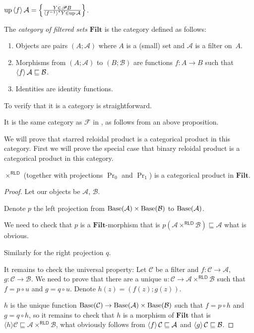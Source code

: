 \begin{cor}
$\operatorname{up}\left\langle f\right\rangle\mathcal{A} = \left\{ \frac{Y\in\mathscr{P} B}{\left\langle f^{-1}\right\rangle ^{\ast}Y\in\operatorname{up}\mathcal{A}}\right\}$.
\end{cor}

\begin{defn}
The \emph{category of filtered sets} $\mathbf{Filt}$ is the category defined as follows:
\begin{enumerate}
\item Objects are pairs $(A;\mathcal{A})$ where $A$ is a (small) set and $\mathcal{A}$ is a filter on~$A$.
\item Morphisms from $(A;\mathcal{A})$ to $(B;\mathcal{B})$ are functions $f:A\rightarrow B$ such that
$\left\langle f\right\rangle\mathcal{A} \sqsubseteq \mathcal{B}$.
\item Identities are identity functions.
\end{enumerate}
\end{defn}

To verify that it is a category is straightforward.

It is the same category as $\mathscr{F}$ in \cite{filt-cat}, as follows from an above proposition.

We will prove that starred reloidal product is a categorical product in this category.
First we will prove the special case that binary reloidal product is a categorical product in this category.

\begin{thm}
  $\times^{\mathsf{RLD}}$ (together with projections $\Pr_0$ and
  $\Pr_1$) is a categorical product in $\mathbf{Filt}$.
\end{thm}

\begin{proof}
  Let our objects be $\mathcal{A}$, $\mathcal{B}$.
  
  Denote $p$ the left projection from $\operatorname{Base} (\mathcal{A}) \times
  \operatorname{Base} (\mathcal{B})$ to $\operatorname{Base} (\mathcal{A})$.
  
  We need to check that $p$ is a $\mathbf{Filt}$-morphism that is $p
  (\mathcal{A} \times^{\mathsf{RLD}} \mathcal{B}) \sqsubseteq
  \mathcal{A}$ what is obvious.
  
  Similarly for the right projection $q$.
  
  It remains to check the universal property: Let $\mathcal{C}$ be a filter
  and $f : \mathcal{C} \rightarrow \mathcal{A}$, $g : \mathcal{C} \rightarrow
  \mathcal{B}$. We need to prove that there are a unique $u : \mathcal{C}
  \rightarrow \mathcal{A} \times^{\mathsf{RLD}} \mathcal{B}$ such that
  $f = p \circ u$ and $g = q \circ u$. Denote $h (z) = (f (z) ; g (z))$.
  
  $h$ is the unique function $\operatorname{Base} (\mathcal{C}) \rightarrow
  \operatorname{Base} (\mathcal{A}) \times \operatorname{Base} (\mathcal{B})$ such that $f = p
  \circ h$ and $g = q \circ h$, so it remains to check that $h$ is a morphism
  of $\mathbf{Filt}$ that is $\langle h \rangle \mathcal{C}
  \sqsubseteq \mathcal{A} \times^{\mathsf{RLD}} \mathcal{B}$, what
  obviously follows from $\left\langle f\right\rangle \mathcal{C} \sqsubseteq
  \mathcal{A}$ and $\left\langle g\right\rangle \mathcal{C} \sqsubseteq \mathcal{B}$.
\end{proof}

